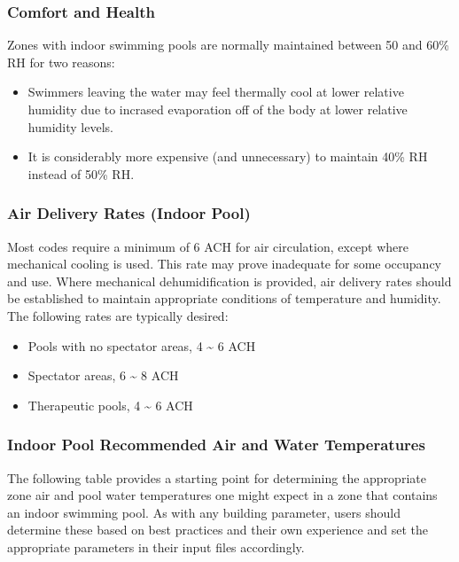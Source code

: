 \subsubsection{Comfort and Health}\label{comfort-and-health}

Zones with indoor swimming pools are normally maintained between 50 and 60\% RH for two reasons:

\begin{itemize}
\tightlist
\item
  Swimmers leaving the water may feel thermally cool at lower relative humidity due to incrased evaporation off of the body at lower relative humidity levels.
\item
  It is considerably more expensive (and unnecessary) to maintain 40\% RH instead of 50\% RH.
\end{itemize}

\subsubsection{Air Delivery Rates (Indoor Pool)}\label{air-delivery-rates-indoor-pool}

Most codes require a minimum of 6 ACH for air circulation, except where mechanical cooling is used. This rate may prove inadequate for some occupancy and use. Where mechanical dehumidification is provided, air delivery rates should be established to maintain appropriate conditions of temperature and humidity. The following rates are typically desired:

\begin{itemize}
\tightlist
\item
  Pools with no spectator areas, 4 \textasciitilde{} 6 ACH
\item
  Spectator areas, 6 \textasciitilde{} 8 ACH
\item
  Therapeutic pools, 4 \textasciitilde{} 6 ACH
\end{itemize}

\subsubsection{Indoor Pool Recommended Air and Water Temperatures}\label{indoor-pool-recommended-air-and-water-temperatures}

The following table provides a starting point for determining the appropriate zone air and pool water temperatures one might expect in a zone that contains an indoor swimming pool.  As with any building parameter, users should determine these based on best practices and their own experience and set the appropriate parameters in their input files accordingly.

